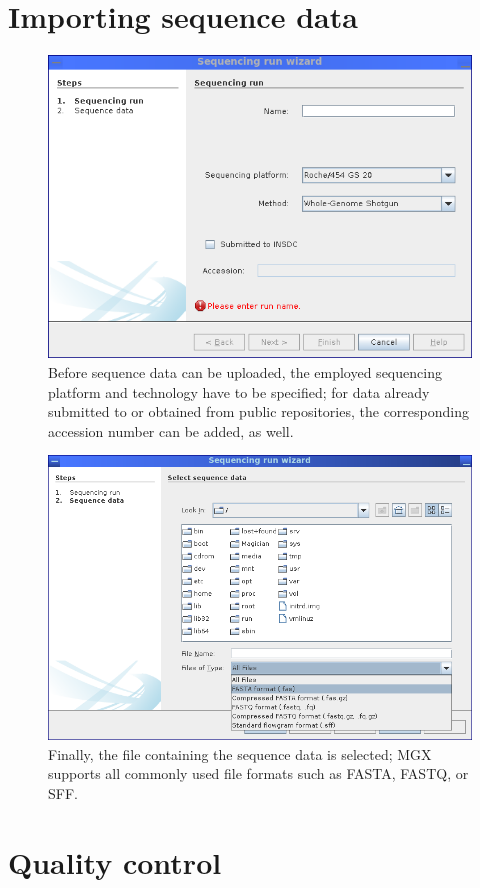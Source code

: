 \section{Importing sequence data}

\begin{figure}[H]
\centering
\includegraphics[width=.8\textwidth]{img/mgx/runwiz1}
\caption[Sequence import]{Before sequence data can be uploaded, the employed sequencing platform and technology have 
to be specified; for data already submitted to or obtained from public repositories, the corresponding accession
number can be added, as well.}
\label{dnawiz1}
\end{figure}

\begin{figure}[H]
\centering
\includegraphics[width=.8\textwidth]{img/mgx/runwiz2}
\caption[Sequence import]{Finally, the file containing the sequence data is selected; MGX supports all commonly used
file formats such as FASTA, FASTQ, or SFF.}
\label{dnawiz2}
\end{figure}

\section{Quality control}

